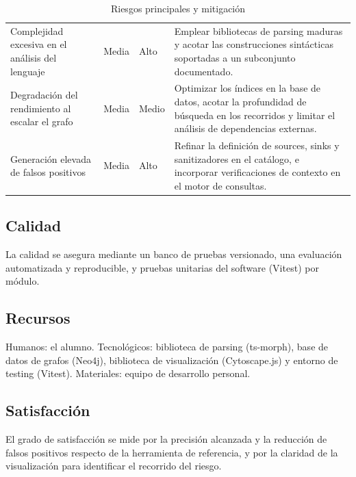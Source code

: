 \begin{table}[H]
    \centering
    \caption{Riesgos principales y mitigación}
    \label{tab:riesgos-iniciales}
    \small
    \begin{tabularx}{\textwidth}{L l l L}
        \toprule
         &  &  &  \\
        \midrule
        Complejidad excesiva en el análisis del lenguaje & Media & Alto & Emplear bibliotecas de parsing maduras y acotar las construcciones sintácticas soportadas a un subconjunto documentado. \\
        Degradación del rendimiento al escalar el grafo & Media & Medio & Optimizar los índices en la base de datos, acotar la profundidad de búsqueda en los recorridos y limitar el análisis de dependencias externas. \\
        Generación elevada de falsos positivos & Media & Alto & Refinar la definición de sources, sinks y sanitizadores en el catálogo, e incorporar verificaciones de contexto en el motor de consultas. \\
        \bottomrule
    \end{tabularx}
\end{table}

\subsection{Calidad}\label{sec:n2.4.5}

La calidad se asegura mediante un banco de pruebas versionado, una evaluación automatizada y reproducible, y pruebas unitarias del software (Vitest) por módulo.

\subsection{Recursos}\label{sec:n2.4.6}

Humanos: el alumno. Tecnológicos: biblioteca de parsing (ts-morph), base de datos de grafos (Neo4j), biblioteca de visualización (Cytoscape.js) y entorno de testing (Vitest). Materiales: equipo de desarrollo personal.

\subsection{Satisfacción}\label{sec:n2.4.7}

El grado de satisfacción se mide por la precisión alcanzada y la reducción de falsos positivos respecto de la herramienta de referencia, y por la claridad de la visualización para identificar el recorrido del riesgo.
